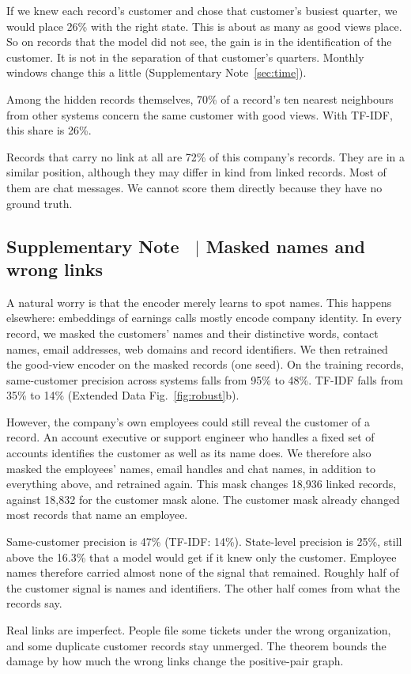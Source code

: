 \documentclass[11pt]{article}
\newcounter{suppnote}
\newcommand{\suppnote}[2]{\refstepcounter{suppnote}\label{#2}\subsection{Supplementary Note \thesuppnote\ $|$ #1}}
\begin{document}
If we knew each record's customer and chose that customer's busiest quarter, we would place 26\% with the right state. This is about as many as good views place. So on records that the model did not see, the gain is in the identification of the customer. It is not in the separation of that customer's quarters. Monthly windows change this a little (Supplementary Note~\ref{sec:time}).

Among the hidden records themselves, 70\% of a record's ten nearest neighbours from other systems concern the same customer with good views. With TF-IDF, this share is 26\%.

Records that carry no link at all are 72\% of this company's records. They are in a similar position, although they may differ in kind from linked records. Most of them are chat messages. We cannot score them directly because they have no ground truth.

\suppnote{Masked names and wrong links}{sec:mask}
\label{sec:noise}
A natural worry is that the encoder merely learns to spot names. This happens elsewhere: embeddings of earnings calls mostly encode company identity\citep{yu2024samecompany}. In every record, we masked the customers' names and their distinctive words, contact names, email addresses, web domains and record identifiers. We then retrained the good-view encoder on the masked records (one seed). On the training records, same-customer precision across systems falls from 95\% to 48\%. TF-IDF falls from 35\% to 14\% (Extended Data Fig.~\ref{fig:robust}b).

However, the company's own employees could still reveal the customer of a record. An account executive or support engineer who handles a fixed set of accounts identifies the customer as well as its name does. We therefore also masked the employees' names, email handles and chat names, in addition to everything above, and retrained again. This mask changes 18{,}936 linked records, against 18{,}832 for the customer mask alone. The customer mask already changed most records that name an employee.

Same-customer precision is 47\% (TF-IDF: 14\%). State-level precision is 25\%, still above the 16.3\% that a model would get if it knew only the customer. Employee names therefore carried almost none of the signal that remained. Roughly half of the customer signal is names and identifiers. The other half comes from what the records say.

Real links are imperfect. People file some tickets under the wrong organization, and some duplicate customer records stay unmerged. The theorem bounds the damage by how much the wrong links change the positive-pair graph.
\end{document}
